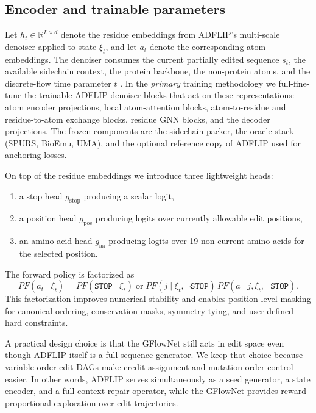\documentclass[11pt]{article}
\newcommand{\RR}{\mathbb{R}}
\newcommand{\PF}{\ensuremath{PF}}
\begin{document}
	
	
	\subsection{Encoder and trainable parameters}
	
	Let $h_t \in \RR^{L\times d}$ denote the residue embeddings from ADFLIP's multi-scale denoiser applied to state $\xi_t$, and let $a_t$ denote the corresponding atom embeddings. The denoiser consumes the current partially edited sequence $s_t$, the available sidechain context, the protein backbone, the non-protein atoms, and the discrete-flow time parameter $t$ \citep{yi2025adflip}. In the \emph{primary} training methodology we full-fine-tune the trainable ADFLIP denoiser blocks that act on these representations: atom encoder projections, local atom-attention blocks, atom-to-residue and residue-to-atom exchange blocks, residue GNN blocks, and the decoder projections. The frozen components are the sidechain packer, the oracle stack (SPURS, BioEmu, UMA), and the optional reference copy of ADFLIP used for anchoring losses.
	
	On top of the residue embeddings we introduce three lightweight heads:
	\begin{enumerate}[leftmargin=1.5em]
		\item a stop head $g_{\mathrm{stop}}$ producing a scalar logit,
		\item a position head $g_{\mathrm{pos}}$ producing logits over currently allowable edit positions,
		\item an amino-acid head $g_{\mathrm{aa}}$ producing logits over 19 non-current amino acids for the selected position.
	\end{enumerate}
	The forward policy is factorized as
	\begin{equation}
		\label{eq:forwardfactorized}
		\PF(a_t\mid \xi_t)=\PF(\mathtt{STOP}\mid\xi_t)\;\text{or}\;\PF(j\mid \xi_t,\neg\mathtt{STOP})\,\PF(a\mid j,\xi_t,\neg\mathtt{STOP}).
	\end{equation}
	This factorization improves numerical stability and enables position-level masking for canonical ordering, conservation masks, symmetry tying, and user-defined hard constraints.
	
	A practical design choice is that the GFlowNet still acts in edit space even though ADFLIP itself is a full sequence generator. We keep that choice because variable-order edit DAGs make credit assignment and mutation-order control easier. In other words, ADFLIP serves simultaneously as a seed generator, a state encoder, and a full-context repair operator, while the GFlowNet provides reward-proportional exploration over edit trajectories.
	
\end{document}
